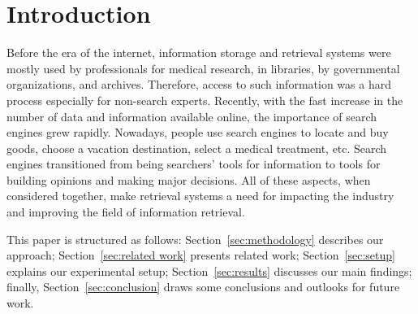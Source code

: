 \section{Introduction}
\label{sec:introduction}

Before the era of the internet, information storage and retrieval systems were mostly
used by professionals for medical research, in libraries, by governmental
organizations, and archives. Therefore, access to such information was a hard process especially
for non-search experts. Recently, with the fast increase in the number of data and information
available online, the importance of search engines grew rapidly. Nowadays, people use
search engines to locate and buy goods, choose a vacation destination, select
a medical treatment, etc. Search engines
transitioned from being searchers' tools for information to tools for building opinions and making
major decisions. All of these aspects, when considered together, make retrieval systems a need for impacting
the industry and improving the field of information retrieval.


This paper is structured as follows: Section~\ref{sec:methodology} describes our
approach; Section~\ref{sec:related work} presents related work; Section~\ref{sec:setup} explains our experimental setup; Section~\ref{sec:results}
discusses our main findings; finally, Section~\ref{sec:conclusion} draws some conclusions and
outlooks for future work.